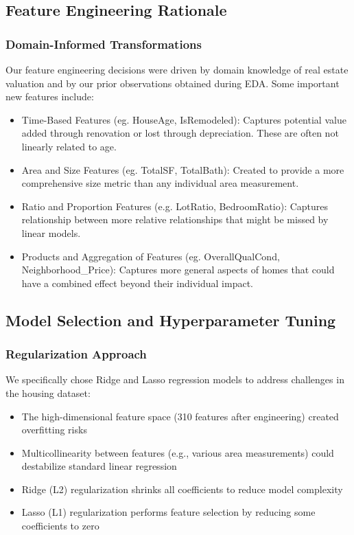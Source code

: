 \documentclass{article}
\begin{document}
\subsection{Feature Engineering Rationale}

\subsubsection{Domain-Informed Transformations}
Our feature engineering decisions were driven by domain knowledge of real estate valuation and by our prior observations obtained during EDA. Some important new features include:
\begin{itemize}
    \item Time-Based Features (eg. HouseAge, IsRemodeled): Captures potential value added through renovation or lost through depreciation. These are often not linearly related to age.
    \item Area and Size Features (eg. TotalSF, TotalBath): Created to provide a more comprehensive size metric than any individual area measurement.
    \item Ratio and Proportion Features (e.g. LotRatio, BedroomRatio): Captures relationship between more relative relationships that might be missed by linear models. 
    \item Products and Aggregation of Features (eg. OverallQualCond, Neighborhood\_Price): Captures more general aspects of homes that could have a combined effect beyond their individual impact.
\end{itemize}

\subsection{Model Selection and Hyperparameter Tuning}

\subsubsection{Regularization Approach}
We specifically chose Ridge and Lasso regression models to address challenges in the housing dataset:
\begin{itemize}
    \item The high-dimensional feature space (310 features after engineering) created overfitting risks
    \item Multicollinearity between features (e.g., various area measurements) could destabilize standard linear regression
    \item Ridge (L2) regularization shrinks all coefficients to reduce model complexity
    \item Lasso (L1) regularization performs feature selection by reducing some coefficients to zero
\end{itemize}
\end{document}
